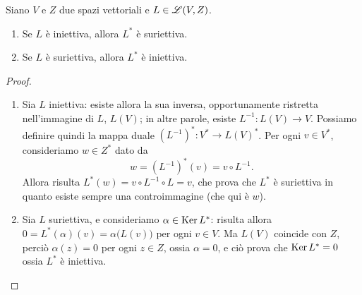 \begin{teorema} \label{t:iniettivita-suriettivita-mappa-duale}
	Siano $V$ e $Z$ due spazi vettoriali e $L\in\mathscr L(V,Z)$.
	\begin{enumerate}
		\item Se $L$ è iniettiva, allora $L^*$ è suriettiva.
		\item Se $L$ è suriettiva, allora $L^*$ è iniettiva.
	\end{enumerate}
\end{teorema}
\begin{proof}
	\begin{enumerate}
		\item Sia $L$ iniettiva: esiste allora la sua inversa, opportunamente ristretta nell'immagine di $L$, $L(V)$; in altre parole, esiste $L^{-1}\colon L(V)\to V$.
			Possiamo definire quindi la mappa duale $(L^{-1})^*\colon V^*\to L(V)^*$.
			Per ogni $v\in V^*$, consideriamo $w\in Z^*$ dato da
			\begin{equation}
				w=(L^{-1})^*(v)=v\circ L^{-1}.
			\end{equation}
			Allora risulta $L^*(w)=v\circ L^{-1}\circ L=v$, che prova che $L^*$ è suriettiva in quanto esiste sempre una controimmagine (che qui è $w$).
		\item Sia $L$ suriettiva, e consideriamo $\alpha\in\operatorname{Ker} L^*$: risulta allora $0=L^*(\alpha)(v)=\alpha\big(L(v)\big)$ per ogni $v\in V$.
			Ma $L(V)$ coincide con $Z$, perciò $\alpha(z)=0$ per ogni $z\in Z$, ossia $\alpha=0$, e ciò prova che $\operatorname{Ker} L^*=0$ ossia $L^*$ è iniettiva.\qedhere
	\end{enumerate}
\end{proof}

